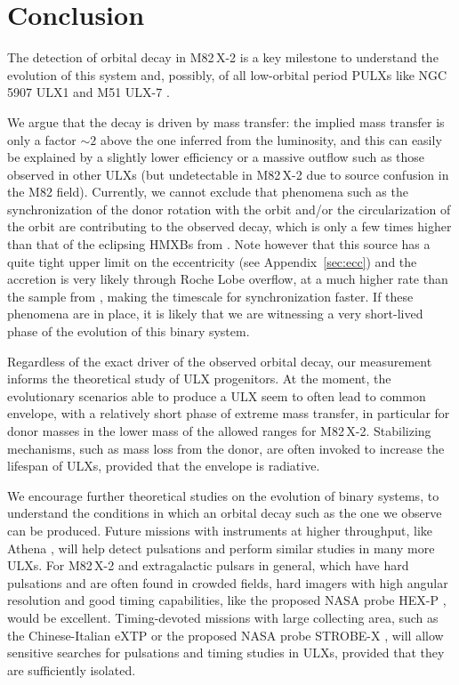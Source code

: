 \documentclass[twocolumn]{aastex631}
\newcommand{\Mtwo}{M82\,X-2\xspace}
\begin{document}
\section{Conclusion}
The detection of orbital decay in \Mtwo is a key milestone to understand the evolution of this system and, possibly, of all low-orbital period PULXs like NGC 5907 ULX1 \citep{israelAccretingPulsarExtreme2017} and M51 ULX-7 \citep{rodriguezcastilloDiscoveryPulsarDay2020}.

We argue that the decay is driven by mass transfer: the implied mass transfer is only a factor $\sim2$ above the one inferred from the luminosity, and this can easily be explained by a slightly lower efficiency or a massive outflow such as those observed in other ULXs (but undetectable in \Mtwo due to source confusion in the M82 field).
Currently, we cannot exclude that phenomena such as the synchronization of the donor rotation with the orbit and/or the circularization of the orbit are contributing to the observed decay, which is only a few times higher than that of the eclipsing HMXBs from  \citet{falangaEphemerisOrbitalDecay2015}.
Note however that this source has a quite tight upper limit on the eccentricity (see Appendix~\ref{sec:ecc}) and the accretion is very likely through Roche Lobe overflow, at a much higher rate than the sample from \citet{falangaEphemerisOrbitalDecay2015}, making the timescale for synchronization faster.
If these phenomena are in place, it is likely that we are witnessing a very short-lived phase of the evolution of this binary system.

Regardless of the exact driver of the observed orbital decay, our measurement informs the theoretical study of ULX progenitors.
At the moment, the evolutionary scenarios able to produce a ULX seem to often lead to common envelope, with a relatively short phase of extreme mass transfer, in particular for donor masses in the lower mass of the allowed ranges for \Mtwo \citep{taurisFormationEvolutionCompact2006,misraOriginPulsatingUltraluminous2020}.
Stabilizing mechanisms, such as mass loss from the donor, are often invoked to increase the lifespan of ULXs, provided that the envelope is radiative.

We encourage further theoretical studies on the evolution of binary systems, to understand the conditions in which an orbital decay such as the one we observe can be produced.
Future missions with instruments at higher throughput, like Athena \citep{barconsAthenaESAXray2017}, will help detect pulsations and perform similar studies in many more ULXs.
For \Mtwo and extragalactic pulsars in general, which have hard pulsations and are often found in crowded fields, hard imagers with high angular resolution and good timing capabilities, like the proposed NASA probe HEX-P \citep{madsenHEXPHighEnergyXray2019}, would be excellent.
Timing-devoted missions with large collecting area, such as the Chinese-Italian eXTP \citep{zhangEXTPEnhancedXray2016} or the proposed NASA probe STROBE-X \citep{raySTROBEXProbeclassMission2018}, will allow sensitive searches for pulsations and timing studies in ULXs, provided that they are sufficiently isolated.
\end{document}
